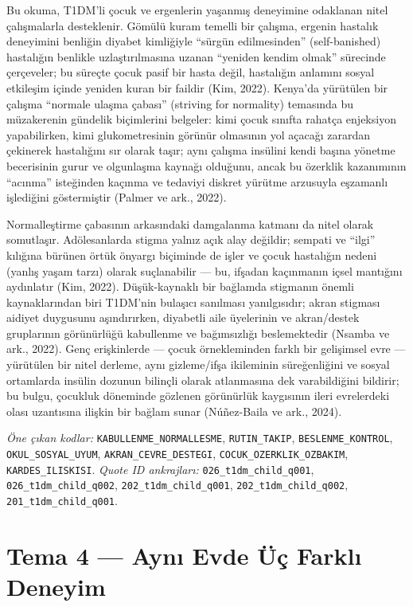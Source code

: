 \documentclass[
  turkish,
  a4paper,
  DIV=11,
  numbers=noendperiod]{scrreprt}
\begin{document}
Bu okuma, T1DM'li çocuk ve ergenlerin yaşanmış deneyimine odaklanan
nitel çalışmalarla desteklenir. Gömülü kuram temelli bir çalışma,
ergenin hastalık deneyimini benliğin diyabet kimliğiyle ``sürgün
edilmesinden'' (self-banished) hastalığın benlikle uzlaştırılmasına
uzanan ``yeniden kendim olmak'' sürecinde çerçeveler; bu süreçte çocuk
pasif bir hasta değil, hastalığın anlamını sosyal etkileşim içinde
yeniden kuran bir faildir (Kim, 2022). Kenya'da yürütülen bir çalışma
``normale ulaşma çabası'' (striving for normality) temasında bu
müzakerenin gündelik biçimlerini belgeler: kimi çocuk sınıfta rahatça
enjeksiyon yapabilirken, kimi glukometresinin görünür olmasının yol
açacağı zarardan çekinerek hastalığını sır olarak taşır; aynı çalışma
insülini kendi başına yönetme becerisinin gurur ve olgunlaşma kaynağı
olduğunu, ancak bu özerklik kazanımının ``acınma'' isteğinden kaçınma ve
tedaviyi diskret yürütme arzusuyla eşzamanlı işlediğini göstermiştir
(Palmer ve ark., 2022).

Normalleştirme çabasının arkasındaki damgalanma katmanı da nitel olarak
somutlaşır. Adölesanlarda stigma yalnız açık alay değildir; sempati ve
``ilgi'' kılığına bürünen örtük önyargı biçiminde de işler ve çocuk
hastalığın nedeni (yanlış yaşam tarzı) olarak suçlanabilir --- bu,
ifşadan kaçınmanın içsel mantığını aydınlatır (Kim, 2022).
Düşük-kaynaklı bir bağlamda stigmanın önemli kaynaklarından biri
T1DM'nin bulaşıcı sanılması yanılgısıdır; akran stigması aidiyet
duygusunu aşındırırken, diyabetli aile üyelerinin ve akran/destek
gruplarının görünürlüğü kabullenme ve bağımsızlığı beslemektedir (Nsamba
ve ark., 2022). Genç erişkinlerde --- çocuk örnekleminden farklı bir
gelişimsel evre --- yürütülen bir nitel derleme, aynı gizleme/ifşa
ikileminin süreğenliğini ve sosyal ortamlarda insülin dozunun bilinçli
olarak atlanmasına dek varabildiğini bildirir; bu bulgu, çocukluk
döneminde gözlenen görünürlük kaygısının ileri evrelerdeki olası
uzantısına ilişkin bir bağlam sunar (Núñez-Baila ve ark., 2024).

\emph{Öne çıkan kodlar:} \texttt{KABULLENME\_NORMALLESME},
\texttt{RUTIN\_TAKIP}, \texttt{BESLENME\_KONTROL},
\texttt{OKUL\_SOSYAL\_UYUM}, \texttt{AKRAN\_CEVRE\_DESTEGI},
\texttt{COCUK\_OZERKLIK\_OZBAKIM}, \texttt{KARDES\_ILISKISI}.
\emph{Quote ID ankrajları:} \texttt{026\_t1dm\_child\_q001},
\texttt{026\_t1dm\_child\_q002}, \texttt{202\_t1dm\_child\_q001},
\texttt{202\_t1dm\_child\_q002}, \texttt{201\_t1dm\_child\_q001}.

\section{Tema 4 --- Aynı Evde Üç Farklı Deneyim}\label{tema-4}
\end{document}

